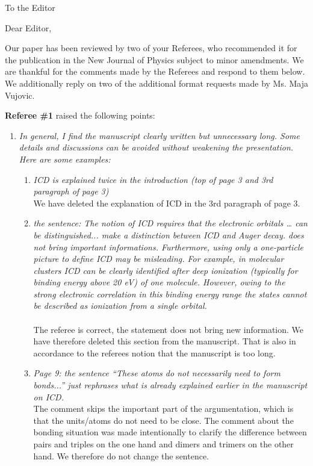 \documentclass[DIN,pagenumber=false,parskip=half,fromalign=left,fromphone=true,fromemail=true,fromurl=false,fromlogo=false,fromrule=false]{scrlttr2}
\begin{document}
\begin{letter}{To the Editor}
	
	\opening{Dear Editor,}


Our paper has been reviewed by two of your Referees,
who recommended it for the publication in the
New Journal of Physics subject to minor amendments.
We are thankful for the comments made by the Referees and
respond to them below. We additionally reply on two of the additional
format requests made by Ms. Maja Vujovic.

\textbf{Referee \#1} raised the following points:

\begin{enumerate}
 \item \emph{In general, I find the manuscript clearly written but unnecessary long. Some details and discussions can be avoided without weakening the presentation. Here are some examples:}
  \begin{enumerate}
   \item \emph{ICD is explained twice in the introduction (top of page 3 and
         3rd paragraph of page 3)}\\
				
				We have deleted the explanation of ICD in the 3rd paragraph of page 3.
				
   \item \emph{the sentence: The notion of ICD requires that the electronic orbitals … can be distinguished... make a distinction between ICD and Auger decay. does not bring important informations. Furthermore, using only a one-particle picture to define ICD may be misleading. For example, in molecular clusters ICD can be clearly identified after deep ionization (typically for binding energy above 20 eV) of one molecule. However, owing to the strong electronic correlation in this binding energy range the states cannot be described as ionization from a single orbital.}\\\vspace{0.3cm}\\
				The referee is correct, the statement does not bring new information. We have therefore deleted this section from the manuscript. That is also in accordance to the referees notion that the manuscript is too long. 
  
	\item \emph{Page 9: the sentence “These atoms do not necessarily need to form bonds...” just rephrases what is already explained earlier in the manuscript on ICD.}\vspace{0.3cm}\\
         The comment skips the important part of the argumentation, which is
         that the units/atoms do not need to be close. The comment about the
         bonding situation was made intentionally to clarify the difference
         between pairs and triples on the one hand and dimers and trimers on
         the other hand. We therefore do not change the sentence.


\end{enumerate}
\end{enumerate}
\end{letter}
\end{document}
